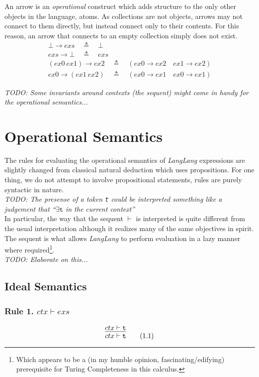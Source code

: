 \documentclass[a4paper,11pt]{article}
\begin{document}
An arrow is an \emph{operational} construct which adds structure to the only other objects in the language, atoms.
As collections are not objects, arrows may not connect to them directly, but instead connect only to their contents.
For this reason, an arrow that connects to an empty collection simply does not exist.
\begin{eqnarray}
\bot \rightarrow exs \quad\triangleq\quad \bot \\
exs \rightarrow \bot \quad\triangleq\quad exs \\
(ex0\ ex1) \rightarrow ex2 \quad\triangleq\quad (ex0 \rightarrow ex2 \quad ex1 \rightarrow ex2) \\
ex0 \rightarrow (ex1\ ex2) \quad\triangleq\quad (ex0 \rightarrow ex1 \quad ex0 \rightarrow ex1)
\end{eqnarray}

\emph{TODO: Some invariants around contexts (the sequent) might come in handy for the operational semantics...}

\section{Operational Semantics}
The rules for evaluating the operational semantics of \textsl{LangLang} expressions are slightly changed from classical natural deduction which uses propositions.
For one thing, we do not attempt to involve propositional statements, rules are purely syntactic in nature.\\
\emph{TODO: The presense of a token \texttt{t} could be interpreted something like a judgement that ``$\exists\texttt{t}$ in the current context''}\\

In particular, the way that the sequent $\vdash$ is interpreted is quite different from the usual interpretation although it realizes many of the same objectives in spirit.
The sequent is what allows \textsl{LangLang} to perform evaluation in a lazy manner where required\footnote{Which appears to be a (in my humble opinion, fascinating/edifying) prerequisite for Turing Completeness in this calculus.}.\\
\emph{TODO: Elaborate on this...}

\subsection{Ideal Semantics}
\subsubsection{Rule 1. $ctx \vdash exs$ }
\begin{equation}
\infer{ctx \vdash \texttt{t}}{ctx \vdash \texttt{t}} \tag{1.1}
\end{equation}
\end{document}
